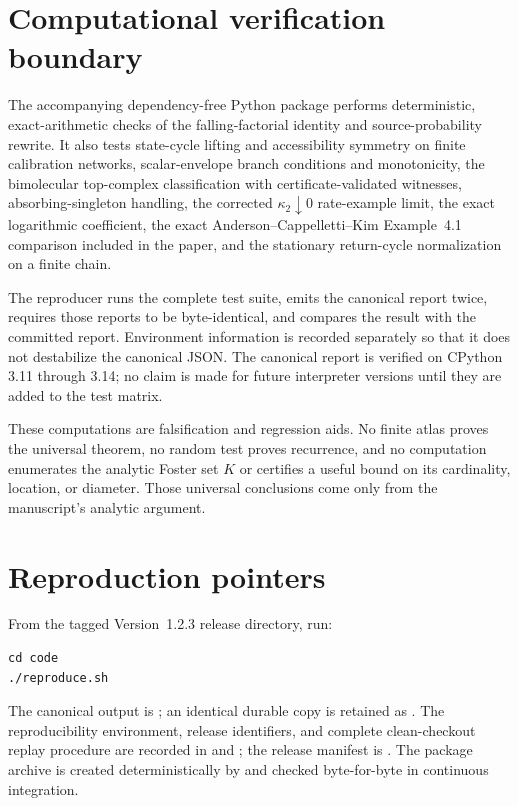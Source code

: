 \documentclass[10pt]{article}
\begin{document}
\section{Computational verification boundary}

The accompanying dependency-free Python package performs deterministic,
exact-arithmetic checks of the falling-factorial identity and
source-probability rewrite.  It also tests state-cycle lifting and accessibility
symmetry on finite calibration networks, scalar-envelope branch conditions and
monotonicity, the bimolecular top-complex classification with
certificate-validated witnesses, absorbing-singleton handling, the corrected
$\kappa_2\downarrow0$ rate-example limit, the exact logarithmic coefficient,
the exact Anderson--Cappelletti--Kim Example~4.1 comparison included in the
paper, and the stationary return-cycle normalization on a finite chain.

The reproducer runs the complete test suite, emits the canonical report twice,
requires those reports to be byte-identical, and compares the result with the
committed report.  Environment information is recorded separately so that it
does not destabilize the canonical JSON.  The canonical report is verified on
CPython 3.11 through 3.14; no claim is made for future interpreter versions
until they are added to the test matrix.

These computations are falsification and regression aids.  No finite atlas
proves the universal theorem, no random test proves recurrence, and no
computation enumerates the analytic Foster set $K$ or certifies a useful bound
on its cardinality, location, or diameter.  Those universal conclusions come
only from the manuscript's analytic argument.

\section{Reproduction pointers}

From the tagged Version~1.2.3 release directory, run:

\begin{verbatim}
cd code
./reproduce.sh
\end{verbatim}

The canonical output is
; an identical durable copy is retained
as .  The reproducibility environment,
release identifiers, and complete clean-checkout replay procedure are recorded
in  and ; the release manifest is
.  The package archive is created
deterministically by  and checked
byte-for-byte in continuous integration.
\end{document}
